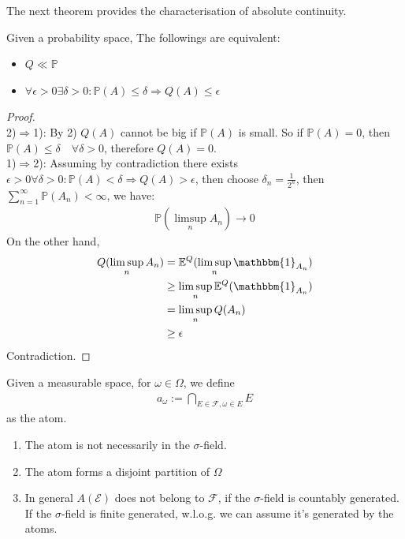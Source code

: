 The next theorem provides the characterisation of absolute continuity.
\begin{theorem}
	Given a probability space, The followings are equivalent:
	\begin{itemize}
		\item $Q \ll \mathbb{P}$
		\item $\forall \epsilon > 0 \exists \delta > 0: \mathbb{P}(A) \leq \delta \Rightarrow Q(A) \leq \epsilon $
	\end{itemize}
\end{theorem}
\begin{proof}
\quad\\
2)$\Rightarrow$1): By 2) $Q(A)$ cannot be big if $\mathbb{P}(A)$ is small. So if $\mathbb{P}(A)= 0$, then $\mathbb{P}(A) \leq \delta \quad \forall \delta > 0$, therefore $Q(A) = 0$.\\ 
1)$\Rightarrow$2): Assuming by contradiction there exists $\epsilon > 0 \forall \delta > 0: \mathbb{P}(A) < \delta \Rightarrow Q(A) > \epsilon$, then choose $\delta_n = \frac{1}{2^n}$, then $\sum_{n = 1}^\infty \mathbb{P}(A_n) < \infty$, we have:
\begin{align*}
	\mathbb{P}(\limsup_n A_n) \rightarrow 0
\end{align*}
On the other hand, 
\begin{align*}
	Q(\limsup_n A_n) &= \mathbb{E}^Q(\limsup_n  \mathbbm{1}_{A_n})\\
	&\geq \limsup_n  \mathbb{E}^Q( \mathbbm{1}_{A_n})\\
	&= \limsup_n Q( A_n)\\
	&\geq \epsilon
\end{align*}
Contradiction.
\end{proof}

\begin{definition}[Atom]
	Given a measurable space, for $\omega \in \Omega$, we define
	\begin{align*}
		a_\omega := \bigcap_{E \in \mathcal{F}, \omega \in E} E
	\end{align*}
	as the atom.
\end{definition}
\begin{remark}
\quad
\begin{enumerate}
	\item The atom is not necessarily in the $\sigma$-field.
	\item The atom forms a disjoint partition of $\Omega$
	\item In general $A(\mathcal{E})$ does not belong to $\mathcal{F}$, if the $\sigma$-field is countably generated. If the $\sigma$-field is finite generated, w.l.o.g. we can assume it's generated by the atoms.
\end{enumerate}	
\end{remark}

